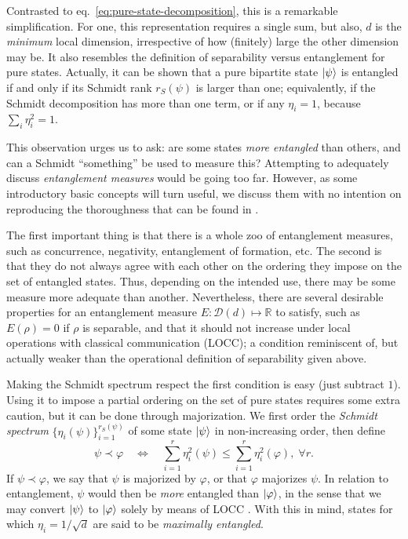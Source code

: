 		Contrasted to eq.~\eqref{eq:pure-state-decomposition}, this is a remarkable simplification. For one, this representation requires a single sum, but also, $d$ is the \emph{minimum} local dimension, irrespective of how (finitely) large the other dimension may be. It also resembles the definition of separability versus entanglement for pure states. Actually, it can be shown that a pure bipartite state $\ket{\psi}$ is entangled if and only if its Schmidt rank $r_S(\psi)$ is larger than one; equivalently, if the Schmidt decomposition has more than one term, or if any $\eta_i = 1$, because $\sum_i \eta_i^2 = 1$.
	
		This observation urges us to ask: are some states \emph{more entangled} than others, and can a Schmidt ``something'' be used to measure this? Attempting to adequately discuss \emph{entanglement measures} would be going too far. However, as some introductory basic concepts will turn useful, we discuss them with no intention on reproducing the thoroughness that can be found in \cite{plenio_2007_entanglementmeasures,terra_tese,horodecki_2009_entanglement,dagmar_2002_entanglement}.
	
		The first important thing is that there is a whole zoo of entanglement measures, such as concurrence, negativity, entanglement of formation, etc. The second is that they do not always agree with each other on the ordering they impose on the set of entangled states. Thus, depending on the intended use, there may be some measure more adequate than another. Nevertheless, there are several desirable properties for an entanglement measure $E : \mathcal{D}(d) \mapsto \mathbb{R}$ to satisfy, such as $E(\rho) = 0$ if $\rho$ is separable, and that it should not increase under local operations with classical communication (LOCC); a condition reminiscent of, but actually weaker than the operational definition of separability given above.
	
		Making the Schmidt spectrum respect the first condition is easy (just subtract $1$). Using it to impose a partial ordering on the set of pure states requires some extra caution, but it can be done through majorization. We first order the \emph{Schmidt spectrum} $\{ \eta_i (\psi) \}_{i=1}^{r_S(\psi)}$ of some state $\ket{\psi}$ in non-increasing order, then define
		$$
			\psi \prec \varphi \quad\Longleftrightarrow\quad \sum_{i=1}^{r} \eta_i^2(\psi) \leq \sum_{i=1}^{r} \eta_i^2(\varphi), \;\forall r .
		$$
		If $\psi \prec \varphi$, we say that $\psi$ is majorized by $\varphi$, or that $\varphi$ majorizes $\psi$. In relation to entanglement, $\psi$ would then be \emph{more} entangled than $\ket{\varphi}$, in the sense that we may convert $\ket{\psi}$ to $\ket{\varphi}$ solely by means of LOCC \cite{nielsen_1999_majorization,terra_tese}. With this in mind, states for which $\eta_i = 1/\sqrt{d}$ are said to be \emph{maximally entangled}.
	

